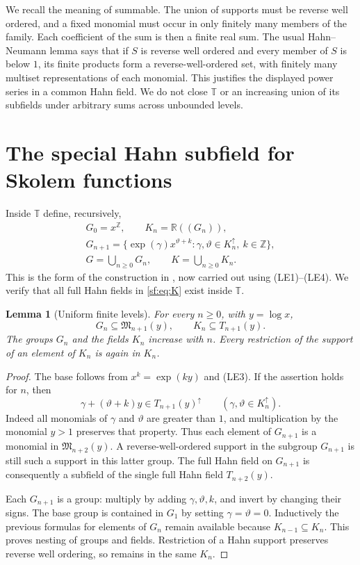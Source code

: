 \documentclass[11pt]{article}
\newtheorem{lemma}[theorem]{Lemma}
\theoremstyle{definition}
\theoremstyle{remark}
\newcommand{\R}{\mathbb R}
\newcommand{\T}{\mathbb T}
\newcommand{\up}{\uparrow}
\newcommand{\Z}{\mathbb Z}
\numberwithin{equation}{section}
\begin{document}
We recall the meaning of summable. The union of supports must be
reverse well ordered, and a fixed monomial must occur in only
finitely many members of the family. Each coefficient of the sum is
then a finite real sum. The usual Hahn--Neumann lemma says that if
$S$ is reverse well ordered and every member of $S$ is below $1$,
its finite products form a reverse-well-ordered set, with finitely
many multiset representations of each monomial. This justifies the
displayed power series in a common Hahn field. We do not close
$\T$ or an increasing union of its subfields under arbitrary sums
across unbounded levels.

\section{The special Hahn subfield for Skolem functions}\label{sf:sec:subfield}

Inside $\T$ define, recursively,
\begin{equation}
 \begin{gathered}
 G_0=x^{\Z},\qquad K_n=\R((G_n)),\\
 G_{n+1}=\{\exp(\gamma)x^{\vartheta+k}:
                  \gamma,\vartheta\in K_n^\up,\ k\in\Z\},\\
 G=\bigcup_{n\ge0}G_n,\qquad K=\bigcup_{n\ge0}K_n.
 \end{gathered}\label{sf:eq:K}
\end{equation}
This is the form of the construction in \cite[Definition~9.1]{BM},
now carried out using (LE1)--(LE4). We verify that all full Hahn
fields in \eqref{sf:eq:K} exist inside $\T$.

\begin{lemma}[Uniform finite levels]\label{sf:lem:levels}
For every $n\ge0$, with $y=\log x$,
\[
 G_n\subseteq\mathfrak M_{n+1}(y),\qquad
 K_n\subseteq T_{n+1}(y).
\]
The groups $G_n$ and the fields $K_n$ increase with $n$. Every
restriction of the support of an element of $K_n$ is again in $K_n$.
\end{lemma}
\begin{proof}
The base follows from $x^k=\exp(ky)$ and (LE3). If the assertion
holds for $n$, then
\[
 \gamma+(\vartheta+k)y\in T_{n+1}(y)^\up
 \qquad(\gamma,\vartheta\in K_n^\up).
\]
Indeed all monomials of $\gamma$ and $\vartheta$ are greater than
$1$, and multiplication by the monomial $y>1$ preserves that
property. Thus each element of $G_{n+1}$ is a monomial in
$\mathfrak M_{n+2}(y)$. A reverse-well-ordered support in the
subgroup $G_{n+1}$ is still such a support in this latter group.
The full Hahn field on $G_{n+1}$ is consequently a subfield of
the single full Hahn field $T_{n+2}(y)$.

Each $G_{n+1}$ is a group: multiply by adding $\gamma,\vartheta,k$,
and invert by changing their signs. The base group is contained in
$G_1$ by setting $\gamma=\vartheta=0$. Inductively the previous
formulas for elements of $G_n$ remain available because
$K_{n-1}\subseteq K_n$. This proves nesting of groups and fields.
Restriction of a Hahn support preserves reverse well ordering, so
remains in the same $K_n$.
\end{proof}
\end{document}
